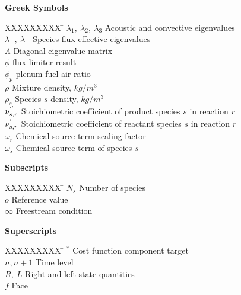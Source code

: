 \begin{nomenclature}
\textbf{Greek Symbols}
\begin{tabbing}
  XXXXXXXXX \= \kill%
  $\lambda_1,\ \lambda_2,\ \lambda_3$ \> Acoustic and convective eigenvalues \\
  $\lambda^-,\ \lambda^+$ \> Species flux effective eigenvalues \\
  $\Lambda$ \> Diagonal eigenvalue matrix \\
  $\phi$ \> flux limiter result \\
  $\phi_p$ \> plenum fuel-air ratio \\
  $\rho$ \> Mixture density, $kg/m^3$ \\
  $\rho_s$ \> Species $s$ density, $kg/m^3$ \\
  $\nu_{s,r}^{''}$ \> Stoichiometric coefficient of product species $s$ in reaction $r$ \\
  $\nu_{s,r}^{'}$ \> Stoichiometric coefficient of reactant species $s$ in reaction $r$ \\
  $\omega_r$ \> Chemical source term scaling factor \\
  $\omega_s$ \> Chemical source term of species $s$ \\
\end{tabbing}

\clearpage

\textbf{Subscripts}
\begin{tabbing}
  XXXXXXXXX \= \kill%
  $N_s$ \> Number of species \\
  $o$ \> Reference value \\
  $\infty$ \> Freestream condition \\
\end{tabbing}

\clearpage

\textbf{Superscripts}
\begin{tabbing}
  XXXXXXXXX \= \kill%
  $^*$ \> Cost function component target \\
  $n, n+1$ \> Time level \\
  $R,\ L$ \> Right and left state quantities \\
  $f$ \> Face
\end{tabbing}

\end{nomenclature}
